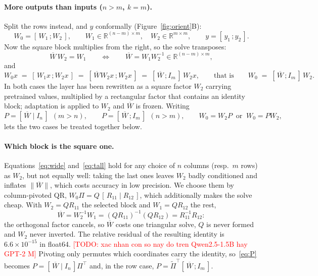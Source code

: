 \documentclass{article}
\newcommand{\TODO}[1]{\textcolor{red}{[TODO: #1]}}
\begin{document}
\paragraph{More outputs than inputs ($n>m$, $k=m$).}
Split the rows instead, and $y$ conformally (Figure~\ref{fig:orient}B):
\[
  W_0=[\,W_1\,;W_2\,],\qquad
  W_1\in\mathbb{R}^{(n-m)\times m},\quad W_2\in\mathbb{R}^{m\times m},
  \qquad y=[\,y_1\,;y_2\,].
\]
Now the square block multiplies from the right, so the solve transposes:
\begin{equation}
  \overline{W}\,W_2=W_1
  \qquad\Longleftrightarrow\qquad
  \overline{W}=W_1W_2^{-1}\in\mathbb{R}^{(n-m)\times m},
  \label{eq:solve-tall}
\end{equation}
and
\begin{equation}
  W_0x \;=\; [\,W_1x\,;W_2x\,] \;=\; [\,\overline{W}W_2x\,;W_2x\,]
        \;=\; [\,\overline{W}\,;I_m\,]\,W_2x,
  \qquad\text{that is}\qquad
  W_0 \;=\; [\,\overline{W}\,;I_m\,]\,W_2 .
  \label{eq:tall}
\end{equation}
In both cases the layer has been rewritten as a square factor $W_2$ carrying
pretrained values, multiplied by a rectangular factor that contains an identity
block; adaptation is applied to $W_2$ and $\overline{W}$ is frozen. Writing
\begin{equation}
  P=[\,\overline{W}\mid I_n\,]\ \ (m>n),
  \qquad
  P=[\,\overline{W}\,;I_m\,]\ \ (n>m),
  \qquad
  W_0=W_2P \ \text{ or } \ W_0=PW_2,
  \label{eq:P}
\end{equation}
lets the two cases be treated together below.

\paragraph{Which block is the square one.}
Equations~\eqref{eq:wide} and~\eqref{eq:tall} hold for any choice of $n$
columns (resp.\ $m$ rows) as $W_2$, but not equally well: taking the last ones
leaves $W_2$ badly conditioned and inflates $\|\overline{W}\|$, which costs
accuracy in low precision. We choose them by column-pivoted QR,
$W_0\Pi=Q\,[\,R_{11}\mid R_{12}\,]$, which additionally makes the solve cheap.
With $W_2=QR_{11}$ the selected block and $W_1=QR_{12}$ the rest,
\begin{equation}
  \overline{W}=W_2^{-1}W_1=(QR_{11})^{-1}(QR_{12})=R_{11}^{-1}R_{12}:
  \label{eq:qcancel}
\end{equation}
the orthogonal factor cancels, so $\overline{W}$ costs one triangular solve,
$Q$ is never formed and $W_2$ never inverted. The relative residual of the
resulting identity is $6.6\times 10^{-15}$ in float64.
\TODO{xac nhan con so nay do tren Qwen2.5-1.5B hay GPT-2 M}
Pivoting only permutes which coordinates carry the identity, so~\eqref{eq:P}
becomes $P=[\,\overline{W}\mid I_n\,]\Pi^{\top}$ and, in the row case,
$P=\tilde{\Pi}^{\top}[\,\overline{W}\,;I_m\,]$.
\end{document}

